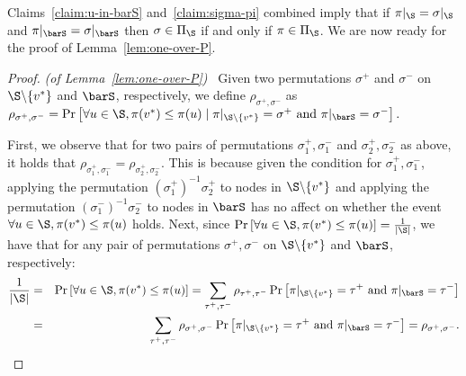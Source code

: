 Claims~\ref{claim:u-in-barS} and~\ref{claim:sigma-pi} combined imply that if $\pi|_{\S}=\sigma|_{\S}$ and $\pi|_{\barS}=\sigma|_{\barS}$ then $\sigma \in \Pi_{\S}$ if and only if $\pi \in \Pi_{\S}$. We are now ready for the proof of Lemma~\ref{lem:one-over-P}.
\begin{proof}
\emph{(of Lemma~\ref{lem:one-over-P})~}
Given two permutations $\sigma^{+}$ and $\sigma^{-}$ on $\S\backslash\{v^*\}$ and $\barS$, respectively, we define $\rho_{\sigma^{+},\sigma^{-}}$ as 
$\rho_{\sigma^{+},\sigma^{-}} = \Pr\left[\forall u\in\S, \pi(v^*) \leq \pi(u) \mid\pi|_{\S\backslash\{v^*\}}=\sigma^{+} \mbox{ and } \pi|_{\barS}=\sigma^{-}\right].$



First, we observe that for two pairs of permutations $\sigma_{1}^{+},\sigma_{1}^{-}$ and $\sigma_{2}^{+},\sigma_{2}^{-}$ as above, it holds that $\rho_{\sigma_{1}^{+},\sigma_{1}^{-}}=\rho_{\sigma_{2}^{+},\sigma_{2}^{-}}$. This is because given the condition for $\sigma_{1}^{+},\sigma_{1}^{-}$, applying the permutation $(\sigma_{1}^{+})^{-1}\sigma_{2}^{+}$ to nodes in $\S\backslash\{v^*\}$ and applying the permutation $(\sigma_{1}^{-})^{-1}\sigma_{2}^{-}$ to nodes in $\barS$ has no affect on whether the event $\forall u\in\S, \pi(v^*)\leq\pi(u)$ holds.
Next, since $\Pr\left[\forall u\in\S, \pi(v^*)\leq\pi(u)\right]=\frac{1}{|\S|}$, we have that for any pair of permutations $\sigma^{+},\sigma^{-}$ on $\S\backslash\{v^*\}$ and $\barS$, respectively:
\vspace{-0.1in}
\begin{eqnarray*}
\frac{1}{|\S|} & = & \Pr\left[\forall u\in\S, \pi(v^*)\leq\pi(u)\right]=\sum_{\tau^{+},\tau^{-}}\rho_{\tau^{+},\tau^{-}}\Pr\left[\pi|_{\S\backslash\{v^*\}}=\tau^{+}\mbox{ and }\pi|_{\barS}=\tau^{-}\right]\\
 & = & \sum_{\tau^{+},\tau^{-}}\rho_{\sigma^{+},\sigma^{-}}\Pr\left[\pi|_{\S\backslash\{v^*\}}=\tau^{+}\mbox{ and }\pi|_{\barS}=\tau^{-}\right]=\rho_{\sigma^{+},\sigma^{-}}.
\end{eqnarray*}


\end{proof}
